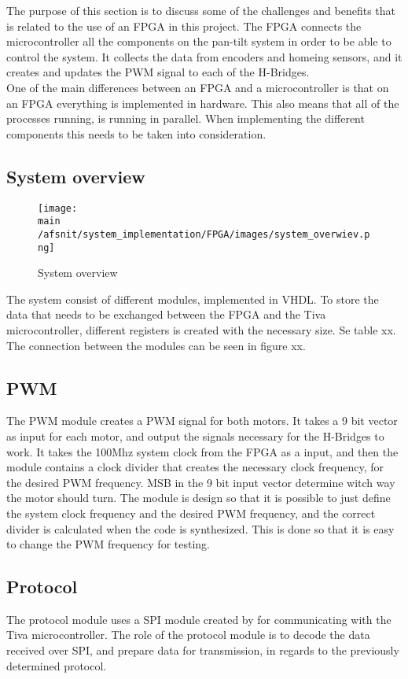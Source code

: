 \documentclass[../../../main]{subfiles}
\begin{document}
The purpose of this section is to discuss some of the challenges and benefits that is related to the use of an FPGA in this project.
The FPGA connects the  microcontroller all the components on the pan-tilt system in order to be able to control the system. It collects the data from encoders and homeing sensors, and it creates and updates the PWM signal to each of the H-Bridges.
\\
One of the main differences between an FPGA and a microcontroller is that on an FPGA everything is implemented in hardware. This also means that all of the processes running, is running in parallel. When implementing the different components this needs to be taken into consideration.
\subsection{System overview}%
\label{sub:system_overview}
\begin{figure}[H] 
    \texttt{[image: \\main /afsnit/system\_implementation/FPGA/images/system\_overwiev.png]}
    \caption {System overview}
    \label{fig:system_overview_FPGA}
\end{figure}
The system consist of different modules, implemented in VHDL. 
To store the data that needs to be exchanged between the FPGA and the Tiva microcontroller, different registers is created with the necessary size. Se table xx. 
\\
The connection between the modules can be seen in figure xx. 
\subsection{PWM}
The PWM module creates a PWM signal for both motors. It takes a 9 bit vector as input for each motor, and output the signals necessary for the H-Bridges to work. 
It takes the 100Mhz system clock from the FPGA as a input, and then the module contains a clock divider that creates the necessary clock frequency, for the desired PWM frequency. 
MSB in the 9 bit input vector determine witch way the motor should turn. 
The module is design so that it is possible to just define the system clock frequency and the desired PWM frequency, and the correct divider is calculated when the code is synthesized.
This is done so that it is easy to change the PWM frequency for testing.
\subsection{Protocol}
The protocol module uses a SPI module created by  for communicating with the Tiva microcontroller.
The role of the protocol module is to decode the data received over SPI, and prepare data for transmission, in regards to the previously determined protocol.
\end{document}
